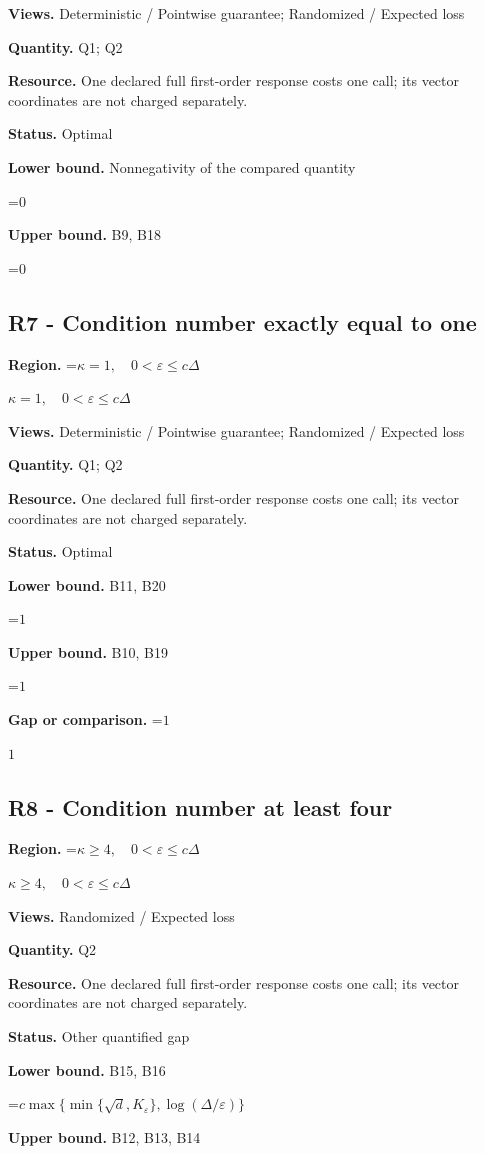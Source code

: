 \documentclass[10pt,a4paper]{article}
\newcommand{\AtlasMath}[1]{\par\begingroup\centering\setbox0=\hbox{$\displaystyle #1$}\ifdim\wd0>1.4\linewidth\typeout{ATLAS WIDE FORMULA: \the\wd0}\fi\ifdim\wd0>\linewidth\resizebox{\linewidth}{!}{\box0}\else\box0\fi\par\endgroup}
\newcommand{\AtlasInlineMath}[1]{\begingroup\setbox0=\hbox{$#1$}\ifdim\wd0>.4\linewidth\endgroup\AtlasMath{#1}\else\endgroup$#1$\fi}
\begin{document}
\textbf{Views.} Deterministic / Pointwise guarantee; Randomized / Expected loss

\textbf{Quantity.} Q1; Q2

\textbf{Resource.} One declared full first-order response costs one call; its vector coordinates are not charged separately.

\textbf{Status.} Optimal

\textbf{Lower bound.} Nonnegativity of the compared quantity

\AtlasMath{0}
\textbf{Upper bound.} B9, B18

\AtlasMath{0}
\subsection{R7 - Condition number exactly equal to one}
\textbf{Region.} \AtlasInlineMath{\kappa=1,\quad0<\varepsilon\le c\Delta}

\textbf{Views.} Deterministic / Pointwise guarantee; Randomized / Expected loss

\textbf{Quantity.} Q1; Q2

\textbf{Resource.} One declared full first-order response costs one call; its vector coordinates are not charged separately.

\textbf{Status.} Optimal

\textbf{Lower bound.} B11, B20

\AtlasMath{1}
\textbf{Upper bound.} B10, B19

\AtlasMath{1}
\textbf{Gap or comparison.} \AtlasInlineMath{1}

\subsection{R8 - Condition number at least four}
\textbf{Region.} \AtlasInlineMath{\kappa\ge4,\quad0<\varepsilon\le c\Delta}

\textbf{Views.} Randomized / Expected loss

\textbf{Quantity.} Q2

\textbf{Resource.} One declared full first-order response costs one call; its vector coordinates are not charged separately.

\textbf{Status.} Other quantified gap

\textbf{Lower bound.} B15, B16

\AtlasMath{c\max\{\min\{\sqrt d,K_\varepsilon\},\log(\Delta/\varepsilon)\}}
\textbf{Upper bound.} B12, B13, B14
\end{document}

